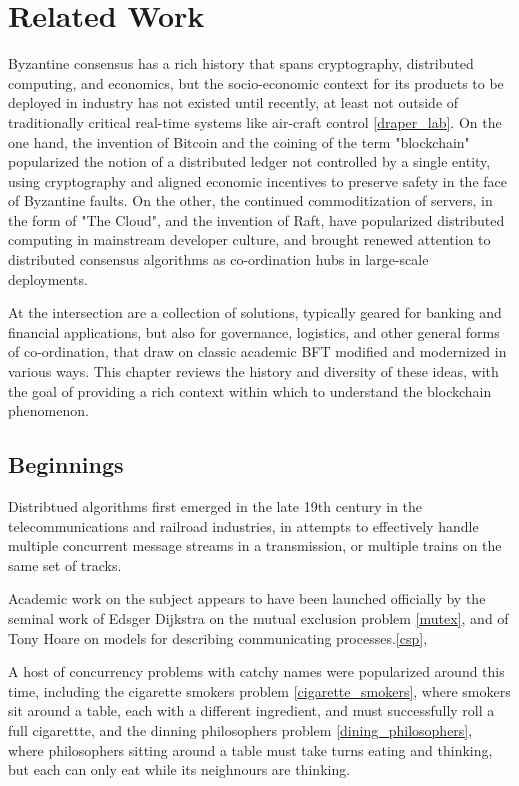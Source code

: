 \chapter{Related Work}
\label{ch:related}

Byzantine consensus has a rich history that spans cryptography, distributed computing, and economics,
but the socio-economic context for its products to be deployed in industry has not existed until recently,
at least not outside of traditionally critical real-time systems like air-craft control \ref{draper_lab}.
On the one hand, the invention of Bitcoin and the coining of the term "blockchain" popularized the notion
of a distributed ledger not controlled by a single entity, using cryptography and aligned economic incentives to 
preserve safety in the face of Byzantine faults.
On the other, the continued commoditization of servers, in the form of "The Cloud", and the invention of Raft, 
have popularized distributed computing in mainstream developer culture, 
and brought renewed attention to distributed consensus algorithms as co-ordination hubs in large-scale deployments. 

At the intersection are a collection of solutions, typically geared for banking and financial applications,
but also for governance, logistics, and other general forms of co-ordination, 
that draw on classic academic BFT modified and modernized in various ways.
This chapter reviews the history and diversity of these ideas, with the goal of providing a rich context within which to 
understand the blockchain phenomenon.

\section{Beginnings}

Distribtued algorithms first emerged in the late 19th century in the telecommunications and railroad industries,
in attempts to effectively handle multiple concurrent message streams in a transmission, 
or multiple trains on the same set of tracks.

Academic work on the subject appears to have been launched officially by the seminal work
of Edsger Dijkstra on the mutual exclusion problem \ref{mutex}, and of Tony Hoare on models for describing communicating processes.\ref{csp}, 

A host of concurrency problems with catchy names were popularized around this time,
including the cigarette smokers problem \ref{cigarette_smokers}, where smokers sit around a table, 
each with a different ingredient, and must successfully roll a full cigarettte,
and the dinning philosophers problem \ref{dining_philosophers},
where philosophers sitting around a table must take turns eating and thinking,
but each can only eat while its neighnours are thinking.

